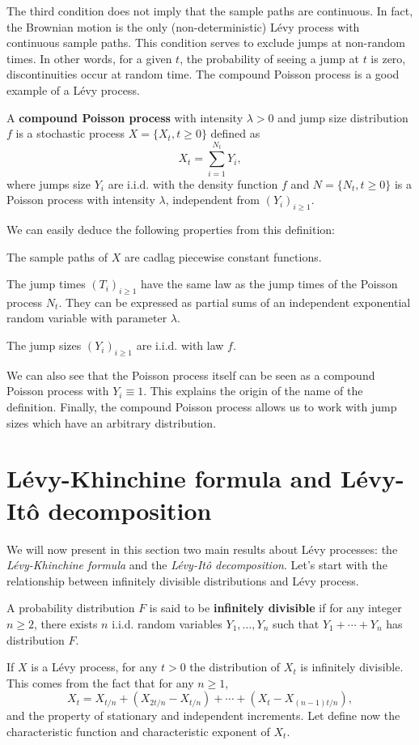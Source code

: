 The third condition does not imply that the sample paths are continuous. In fact, the Brownian motion is the only (non-deterministic) L\'evy process with continuous sample paths. This condition serves to exclude jumps at non-random times. In other words, for a given $t$, the probability of seeing a jump at $t$ is zero, discontinuities occur at random time. The compound Poisson process is a good example of a L\'evy process.

\begin{defn}
A \textbf{compound Poisson process} with intensity $\lambda > 0$ and jump size distribution $f$ is a stochastic process $X=\{X_t,t\geq 0\}$ defined as 
$$X_t = \sum_{i=1}^{N_t}Y_i,$$
where jumps size $Y_i$ are i.i.d. with the density function $f$ and $N=\{N_t,t\geq 0\}$ is a Poisson process with intensity $\lambda$, independent from $(Y_i)_{i\geq 1}$.
\end{defn}
We can easily deduce the following properties from this definition:
\begin{my_list_num}
\item The sample paths of $X$ are cadlag piecewise constant functions.
\item The jump times $(T_i)_{i\geq 1}$ have the same law as the jump times of the Poisson process $N_t$. They can be expressed as partial sums of an independent exponential random variable with parameter $\lambda$.
\item The jump sizes $(Y_i)_{i\geq1}$ are i.i.d. with law $f$.
\end{my_list_num}
We can also see that the Poisson process itself can be seen as a compound Poisson process with $Y_i \equiv 1$. This explains the origin of the name of the definition. Finally, the compound Poisson process allows us to work with jump sizes which have an arbitrary distribution.

\section{L\'evy-Khinchine formula and L\'evy-Itô decomposition}
\label{sec:Levy:theorems}
We will now present in this section two main results about L\'evy processes: the \textit{L\'evy-Khinchine formula} and the \textit{L\'evy-Itô decomposition}. Let's start with the relationship between infinitely divisible distributions and L\'evy process.

\begin{defn}
A probability distribution $F$ is said to be \textbf{infinitely divisible} if for any integer $n\geq 2$, there exists $n$ i.i.d. random variables $Y_1,\ldots,Y_n$ such that $Y_1+\cdots+Y_n$ has distribution $F$.
\end{defn}
If $X$ is a L\'evy process, for any $t>0$ the distribution of $X_t$ is infinitely divisible. This comes from the fact that for any $n \geq 1$,
\begin{equation}\label{eq:inf-div}
X_t = X_{t/n} + (X_{2t/n}-X_{t/n}) + \cdots + (X_t - X_{(n-1)t/n}),
\end{equation}
and the property of stationary and independent increments. Let define now the characteristic function and characteristic  exponent of $X_t$.

